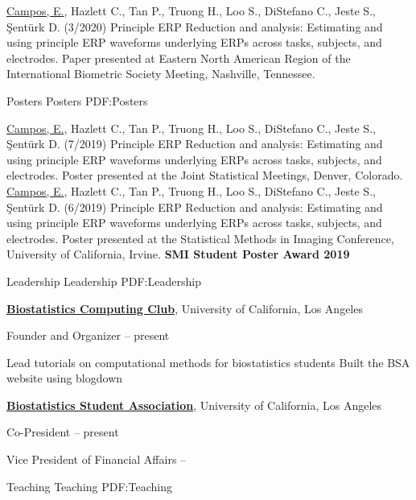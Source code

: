 \documentclass[letterpaper,MMMyyyy,nonstopmode]{simpleresumecv}
\begin{document}
\begin{Body}
\BigGap
\BulletItem
\underline{Campos, E.}, Hazlett C., Tan P., Truong H., Loo S., DiStefano C., Jeste S., \c{S}ent\"{u}rk D. (3/2020) Principle ERP Reduction and analysis: Estimating and using principle ERP waveforms underlying ERPs across tasks, subjects, and electrodes. Paper presented at Eastern North American Region of the International Biometric Society Meeting, Nashville, Tennessee.


\BigGap
\SubSection
{Posters}
{Posters}
{PDF:Posters}

\BigGap 
\BulletItem 
\underline{Campos, E.}, Hazlett C., Tan P., Truong H., Loo S., DiStefano C., Jeste S., \c{S}ent\"{u}rk D. (7/2019) Principle ERP Reduction and analysis: Estimating and using principle ERP waveforms underlying ERPs across tasks, subjects, and electrodes. Poster presented at the Joint Statistical Meetings, Denver, Colorado.
\BigGap
\BulletItem 
\underline{Campos, E.}, Hazlett C., Tan P., Truong H., Loo S., DiStefano C., Jeste S., \c{S}ent\"{u}rk D. (6/2019) Principle ERP Reduction and analysis: Estimating and using principle ERP waveforms underlying ERPs across tasks, subjects, and electrodes. Poster presented at the Statistical Methods in Imaging Conference, University of California, Irvine. \textbf{SMI Student Poster Award 2019}



\Section
{Leadership}
{Leadership}
{PDF:Leadership}

\Entry
\href{http://ucla-bsa.netlify.com}
{\textbf{Biostatistics Computing Club}},
University of California, Los Angeles

Founder and Organizer
\hfill
{} -- present
\begin{Detail}
\SubBulletItem
Lead tutorials on computational methods for biostatistics students
\SubBulletItem
Built the BSA website using blogdown
\end{Detail}
\BigGap
\Entry
\href{http://www.example.com/my-club}
{\textbf{Biostatistics Student Association}},
University of California, Los Angeles

Co-President 
\hfill
{} -- present

Vice President of Financial Affairs
\hfill
{} -- 



\Section
{Teaching}
{Teaching}
{PDF:Teaching}


\end{Body}
\end{document}
